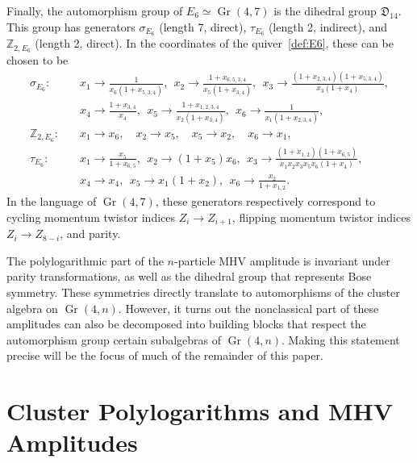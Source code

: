 \documentclass[11pt]{article}
\DeclareMathOperator{\Gr}{Gr}
\begin{document}
Finally, the automorphism group of $E_6 \simeq \Gr(4,7)$ is the dihedral group ${\mathfrak D}_{14}$. This group has generators $\sigma_{E_6}$ (length 7, direct), $\tau_{E_6}$ (length 2, indirect), and $\mathbb{Z}_{2,E_6}$ (length 2, direct). In the coordinates of the quiver~\eqref{def:E6}, these can be chosen to be 
\begin{equation}
\begin{split}
  \sigma_{E_6}:\quad& 
    x_1\to \frac{1}{x_6 (1+x_{5,3,4})},~~
    x_2\to \frac{1+x_{6,5,3,4}}{x_5 (1+x_{3,4})},~~
    x_3\to \frac{(1+x_{2,3,4}) (1+x_{5,3,4})}{x_3 (1+x_4)},\\&
    x_4\to \frac{1+x_{3,4}}{x_4},~~
    x_5\to \frac{1+x_{1,2,3,4}}{x_2 (1+x_{3,4})},~~
    x_6\to \frac{1}{x_1 (1+x_{2,3,4})},\\[2ex]
  \mathbb{Z}_{2,E_6}:\quad& 
    x_1\to x_6, \quad x_2\to x_5, \quad x_5\to x_2, \quad x_6\to x_1, \\[2ex]
  \tau_{E_6}:\quad& 
    x_1\to \frac{x_5}{1+x_{6,5}},~~
    x_2\to (1+x_5) x_6,~~
    x_3\to \frac{(1+x_{1,2}) (1+x_{6,5})}{x_1 x_2 x_3 x_5 x_6 (1+x_4)},\\&
    x_4\to x_4,~~
    x_5\to x_1 (1+x_2),~~
    x_6\to \frac{x_2}{1+x_{1,2}}.
\end{split}  
\end{equation}
In the language of $\Gr(4,7)$, these generators respectively correspond to cycling momentum twistor indices $Z_i \to Z_{i+1}$, flipping momentum twistor indices $Z_i \to Z_{8-i}$, and parity. 

The polylogarithmic part of the $n$-particle MHV amplitude is invariant under parity transformations, as well as the dihedral group that represents Bose symmetry. These symmetries directly translate to automorphisms of the cluster algebra on $\Gr(4,n)$. However, it turns out the nonclassical part of these amplitudes can also be decomposed into building blocks that respect the automorphism group certain subalgebras of $\Gr(4,n)$. Making this statement precise will be the focus of much of the remainder of this paper. 

\section{Cluster Polylogarithms and MHV Amplitudes} \label{sec:cluster_polylog_MHV_review}
\end{document}

